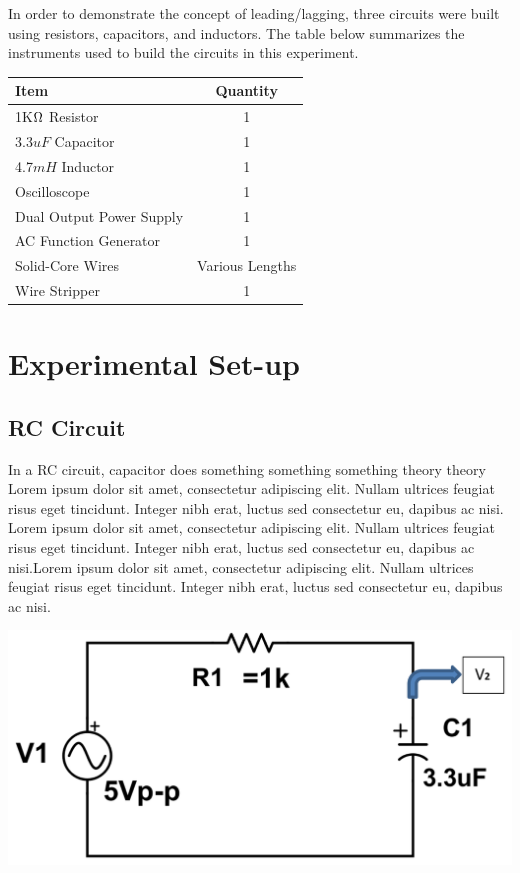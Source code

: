 \documentclass[journal]{IEEEtran}
\begin{document}
\noindent In order to demonstrate the concept of leading/lagging, three circuits were built using resistors, capacitors, and inductors. The table below summarizes the instruments used to build the circuits in this experiment. \\

\begingroup
    \medskip
\centering
\def\arraystretch{1.5}
\begin{tabular}{lc}
\toprule
Item & Quantity \\
\midrule
1K$\ohm$ Resistor & 1 \\
3.3$uF$ Capacitor & 1 \\
4.7$mH$ Inductor & 1 \\
Oscilloscope & 1 \\
Dual Output Power Supply & 1 \\
AC Function Generator & 1 \\
Solid-Core Wires & Various Lengths \\
Wire Stripper & 1 \\
\bottomrule
\end{tabular}
\label{fig:table}
    \medskip
\endgroup



\section{Experimental Set-up}

\subsection{RC Circuit}
\noindent In a RC circuit, capacitor {\color{red}does something something something theory theory Lorem ipsum dolor sit amet, consectetur adipiscing elit. Nullam ultrices feugiat risus eget tincidunt. Integer nibh erat, luctus sed consectetur eu, dapibus ac nisi. Lorem ipsum dolor sit amet, consectetur adipiscing elit. Nullam ultrices feugiat risus eget tincidunt. Integer nibh erat, luctus sed consectetur eu, dapibus ac nisi.Lorem ipsum dolor sit amet, consectetur adipiscing elit. Nullam ultrices feugiat risus eget tincidunt. Integer nibh erat, luctus sed consectetur eu, dapibus ac nisi.}

\begingroup
    \centering
    \medskip
    \includegraphics[width=\columnwidth]{images/lab8_circuit1.png}
    \label{fig:circ1}
    \medskip
\endgroup
\end{document}
